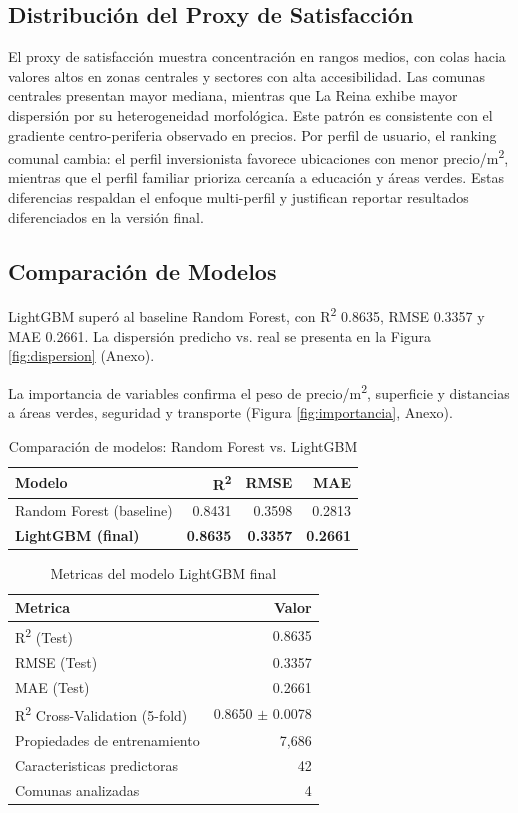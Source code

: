 \documentclass[11pt,letterpaper]{article}
\begin{document}
\subsection{Distribución del Proxy de Satisfacción}
El proxy de satisfacción muestra concentración en rangos medios, con colas hacia valores altos en zonas centrales y sectores con alta accesibilidad. Las comunas centrales presentan mayor mediana, mientras que La Reina exhibe mayor dispersión por su heterogeneidad morfológica. Este patrón es consistente con el gradiente centro-periferia observado en precios.
Por perfil de usuario, el ranking comunal cambia: el perfil inversionista favorece ubicaciones con menor precio/m\textsuperscript{2}, mientras que el perfil familiar prioriza cercanía a educación y áreas verdes. Estas diferencias respaldan el enfoque multi-perfil y justifican reportar resultados diferenciados en la versión final.

\subsection{Comparación de Modelos}
LightGBM superó al baseline Random Forest, con R\textsuperscript{2} 0.8635, RMSE 0.3357 y MAE 0.2661. La dispersión predicho vs. real se presenta en la Figura \ref{fig:dispersion} (Anexo).

La importancia de variables confirma el peso de precio/m\textsuperscript{2}, superficie y distancias a áreas verdes, seguridad y transporte (Figura \ref{fig:importancia}, Anexo).

\begin{table}[H]
\centering
\caption{Comparación de modelos: Random Forest vs. LightGBM}
\begin{tabular}{@{}lrrr@{}}
\toprule
\textbf{Modelo} & \textbf{R\textsuperscript{2}} & \textbf{RMSE} & \textbf{MAE} \\
\midrule
Random Forest (baseline) & 0.8431 & 0.3598 & 0.2813 \\
\textbf{LightGBM (final)} & \textbf{0.8635} & \textbf{0.3357} & \textbf{0.2661} \\
\bottomrule
\end{tabular}
\label{tab:comparacion_modelos}
\end{table}

\begin{table}[H]
\centering
\caption{Metricas del modelo LightGBM final}
\begin{tabular}{@{}lr@{}}
\toprule
\textbf{Metrica} & \textbf{Valor} \\
\midrule
R\textsuperscript{2} (Test) & 0.8635 \\
RMSE (Test) & 0.3357 \\
MAE (Test) & 0.2661 \\
R\textsuperscript{2} Cross-Validation (5-fold) & 0.8650 $\pm$ 0.0078 \\
Propiedades de entrenamiento & 7,686 \\
Caracteristicas predictoras & 42 \\
Comunas analizadas & 4 \\
\bottomrule
\end{tabular}
\end{table}
\end{document}

